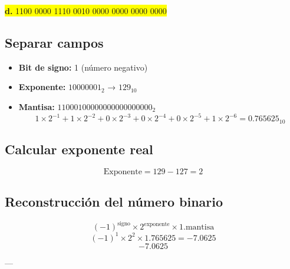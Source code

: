 \documentclass[a4paper,12pt]{article}
\begin{document}
	\newpage
	\begin{center}
		\colorbox{yellow}{\textbf{d.} 1100 0000 1110 0010 0000 0000 0000 0000}
		
		\subsection*{Separar campos}
		
		\begin{itemize}
			\item \textbf{Bit de signo:} 1 (número negativo)
			\item \textbf{Exponente:} $10000001_2$ → $129_{10}$
			\item \textbf{Mantisa:} $11000100000000000000000_2$ 
			\[
			1\times2^{-1} + 1\times2^{-2} + 0\times2^{-3} + 0\times2^{-4} + 0\times2^{-5} + 1\times2^{-6} = 0.765625_{10}
			\]
		\end{itemize}
		
		\subsection*{Calcular exponente real}
		
		\[
		\text{Exponente} = 129 - 127 = 2
		\]
		
		
		
		\subsection*{Reconstrucción del número binario}	
		\[
		(-1)^{\text{signo}} \times 2^{\text{exponente}} \times 1.\text{mantisa}
		\]
		\[
		(-1)^1 \times 2^2 \times 1.765625 = -7.0625
		\]
		\vspace{1em}
		\[
		\boxed{-7.0625}
		\]
		
		---
	\end{center}

	
\end{document}
